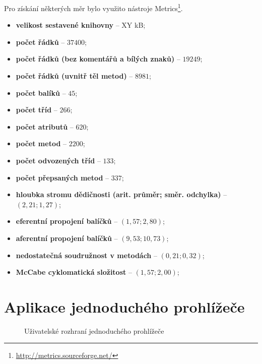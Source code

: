 Pro získání některých měr bylo využito nástroje Metrics\footnote{\url{http://metrics.sourceforge.net/}}.

\begin{itemize}
  \item \textbf{velikost sestavené knihovny} -- XY kB;
  \item \textbf{počet řádků} -- $37400$;
  \item \textbf{počet řádků (bez komentářů a bílých znaků)} -- $19249$;
  \item \textbf{počet řádků (uvnitř těl metod)} -- $8981$;
  \item \textbf{počet balíků} -- $45$;
  \item \textbf{počet tříd} -- $266$;
  \item \textbf{počet atributů} -- $620$;
  \item \textbf{počet metod} -- $2200$;
  \item \textbf{počet odvozených tříd} -- $133$;
  \item \textbf{počet přepsaných metod} -- $337$;
  \item \textbf{hloubka stromu dědičnosti (arit. průměr; směr. odchylka)} -- $(2,21; 1,27)$;
  \item \textbf{eferentní propojení balíčků} -- $(1,57;2,80)$;
  \item \textbf{aferentní propojení balíčků} -- $(9,53;10,73)$;
  \item \textbf{nedostatečná soudružnost v metodách} -- $(0,21;0,32)$;
  \item \textbf{McCabe cyklomatická složitost} -- $(1,57;2,00)$;
\end{itemize}

\chapter{Aplikace jednoduchého prohlížeče}
\label{Annex.SimpleBrowser}

\begin{figure}[H]
  \begin{center}
    \caption{Uživatelské rozhraní jednoduchého prohlížeče}
    \label{Figure.SimpleBrowserScreenshot}
  \end{center}
\end{figure}

